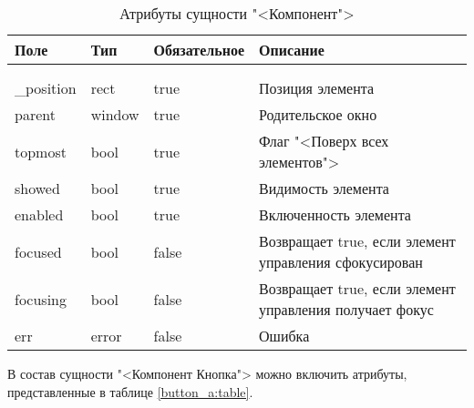 \begin{xltabular}{\textwidth}{|l|l|p{1.7cm}|X|}
	\caption{Атрибуты сущности "<Компонент">\label{control_a:table}}\\ \hline
	\centrow Поле & \centrow Тип & \centrow Обяза\-тельное & \centrow Описание \\ \hline
	 &  &  &  \\ \hline
	\endfirsthead
	 &  &  &  \\ \hline
	\finishhead
	\_position & rect & true & Позиция элемента \\ \hline
	parent & window & true & Родительское окно \\ \hline 
	topmost & bool & true & Флаг "<Поверх всех элементов"> \\ \hline 
	showed & bool & true & Видимость элемента \\ \hline 
	enabled & bool & true & Включенность элемента \\ \hline 
	focused & bool & false & Возвращает true, если элемент управления сфокусирован \\ \hline 
	focusing & bool & false & Возвращает true, если элемент управления получает фокус \\ \hline
	err & error & false & Ошибка
\end{xltabular}

В состав сущности "<Компонент Кнопка"> можно включить атрибуты, представленные в таблице \ref{button_a:table}.

